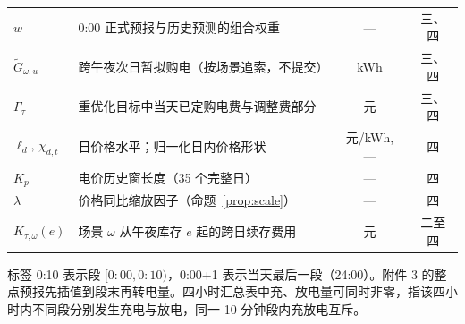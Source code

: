 \begin{table}[!htbp]
\begin{tabularx}{\textwidth}{@{}lXcc@{}}
$w$ & 0:00 正式预报与历史预测的组合权重 & --- & 三、四 \\
$\widetilde G_{\omega,u}$ & 跨午夜次日暂拟购电（按场景追索，不提交） & kWh & 三、四 \\
$\Gamma_\tau$ & 重优化目标中当天已定购电费与调整费部分 & 元 & 三、四 \\
$\ell_d,\,\chi_{d,t}$ & 日价格水平；归一化日内价格形状 & 元/kWh, --- & 四 \\
$K_p$ & 电价历史窗长度（35 个完整日） & --- & 四 \\
$\lambda$ & 价格同比缩放因子（命题~\ref{prop:scale}） & --- & 四 \\
$K_{\tau,\omega}(e)$ & 场景 $\omega$ 从午夜库存 $e$ 起的跨日续存费用 & 元 & 二至四 \\
\bottomrule\end{tabularx}\end{table}

标签 0:10 表示段 $[0{:}00,0{:}10)$，0:00+1 表示当天最后一段（24:00）。附件 3 的整点预报先插值到段末再转电量。四小时汇总表中充、放电量可同时非零，指该四小时内不同段分别发生充电与放电，同一 10 分钟段内充放电互斥。
